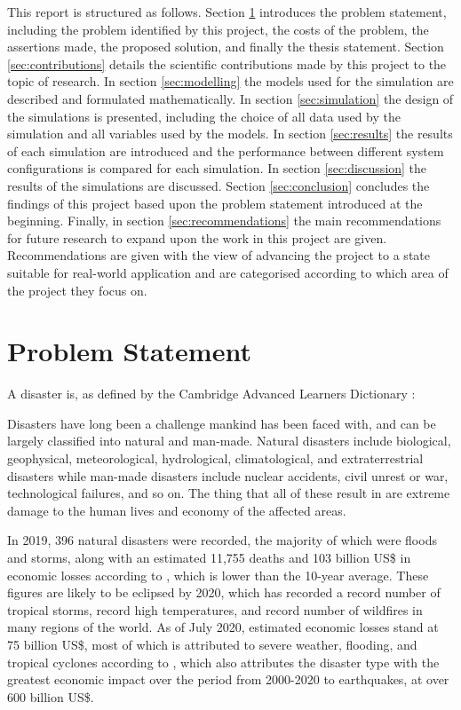 \documentclass[conference]{IEEEtran}
\begin{document}
This report is structured as follows.
Section \ref{sec:problem_statement} introduces the problem statement, including the problem identified by this project, the costs of the problem, the assertions made, the proposed solution, and finally the thesis statement.
Section \ref{sec:contributions} details the scientific contributions made by this project to the topic of research.
In section \ref{sec:modelling} the models used for the simulation are described and formulated mathematically.
In section \ref{sec:simulation} the design of the simulations is presented, including the choice of all data used by the simulation and all variables used by the models.
In section \ref{sec:results} the results of each simulation are introduced and the performance between different system configurations is compared for each simulation.
In section \ref{sec:discussion} the results of the simulations are discussed.
Section \ref{sec:conclusion} concludes the findings of this project based upon the problem statement introduced at the beginning.
Finally, in section \ref{sec:recommendations} the main recommendations for future research to expand upon the work in this project are given.
Recommendations are given with the view of advancing the project to a state suitable for real-world application and are categorised according to which area of the project they focus on.

\section{Problem Statement} \label{sec:problem_statement}

A disaster is, as defined by the Cambridge Advanced Learners Dictionary \cite{dictionary2008cambridge}:


Disasters have long been a challenge mankind has been faced with, and can be largely classified into natural and man-made.
Natural disasters include biological, geophysical, meteorological, hydrological, climatological, and extraterrestrial disasters while man-made disasters include nuclear accidents, civil unrest or war, technological failures, and so on.
The thing that all of these result in are extreme damage to the human lives and economy of the affected areas.

In 2019, 396 natural disasters were recorded, the majority of which were floods and storms, along with an estimated 11,755 deaths and 103 billion US\$ in economic losses according to \cite{cred_2019}, which is lower than the 10-year average.
These figures are likely to be eclipsed by 2020, which has recorded a record number of tropical storms, record high temperatures, and record number of wildfires in many regions of the world.
As of July 2020, estimated economic losses stand at 75 billion US\$, most of which is attributed to severe weather, flooding, and tropical cyclones according to \cite{aon_2020}, which also attributes the disaster type with the greatest economic impact over the period from 2000-2020 to earthquakes, at over 600 billion US\$.
\end{document}
